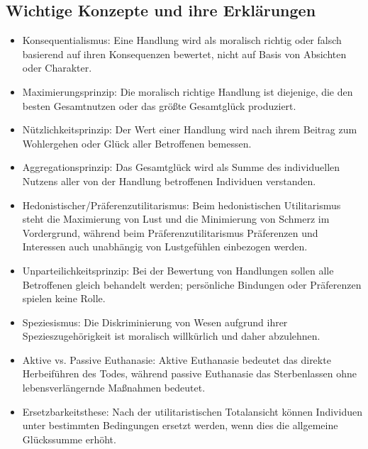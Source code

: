 \documentclass{article}
\begin{document}
\subsection*{Wichtige Konzepte und ihre Erklärungen}
\begin{itemize}
	\item Konsequentialismus: Eine Handlung wird als moralisch richtig oder falsch basierend auf ihren Konsequenzen bewertet, nicht auf Basis von Absichten oder Charakter.

	\item Maximierungsprinzip: Die moralisch richtige Handlung ist diejenige, die den besten Gesamtnutzen oder das größte Gesamtglück produziert.

	\item Nützlichkeitsprinzip: Der Wert einer Handlung wird nach ihrem Beitrag zum Wohlergehen oder Glück aller Betroffenen bemessen.

	\item Aggregationsprinzip: Das Gesamtglück wird als Summe des individuellen Nutzens aller von der Handlung betroffenen Individuen verstanden.

	\item Hedonistischer/Präferenzutilitarismus: Beim hedonistischen Utilitarismus steht die Maximierung von Lust und die Minimierung von Schmerz im Vordergrund, während beim Präferenzutilitarismus Präferenzen und Interessen auch unabhängig von Lustgefühlen einbezogen werden.

	\item Unparteilichkeitsprinzip: Bei der Bewertung von Handlungen sollen alle Betroffenen gleich behandelt werden; persönliche Bindungen oder Präferenzen spielen keine Rolle.

	\item Speziesismus: Die Diskriminierung von Wesen aufgrund ihrer Spezieszugehörigkeit ist moralisch willkürlich und daher abzulehnen.

	\item Aktive vs. Passive Euthanasie: Aktive Euthanasie bedeutet das direkte Herbeiführen des Todes, während passive Euthanasie das Sterbenlassen ohne lebensverlängernde Maßnahmen bedeutet.

	\item Ersetzbarkeitsthese: Nach der utilitaristischen Totalansicht können Individuen unter bestimmten Bedingungen ersetzt werden, wenn dies die allgemeine Glückssumme erhöht.
\end{itemize}
\end{document}
